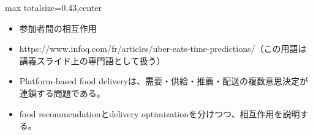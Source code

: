 \clearpage
{}
\begin{minipage}[t]{0.405\textwidth}
\begin{adjustbox}{max totalsize={\textwidth}{0.43\textheight},center}
\begin{minipage}{\textwidth}\scriptsize
{}\begin{itemize}
\item 参加者間の相互作用
\item https://www.infoq.com/fr/articles/uber-eats-time-predictions/（この用語は講義スライド上の専門語として扱う）
\end{itemize}\begin{itemize}
\item Platform-based food deliveryは、需要・供給・推薦・配送の複数意思決定が連鎖する問題である。
\item food recommendationとdelivery optimizationを分けつつ、相互作用を説明する。
\end{itemize}
\end{minipage}
\end{adjustbox}
\end{minipage}\hfill
